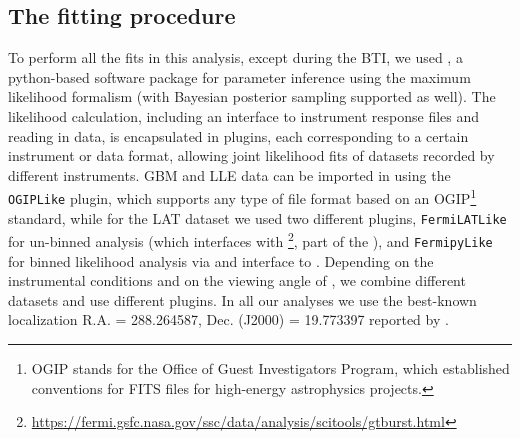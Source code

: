 \documentclass[preprint]{aastex631}
\begin{document}
\subsection{The fitting procedure} 
\label{sec:fitting}
To perform all the fits in this analysis, except during the BTI, we used \ThreeML\citep{3ML}, a python-based software package for parameter inference using the maximum likelihood formalism (with Bayesian posterior sampling supported as well). 
The likelihood calculation, including an interface to instrument response files and reading in data, is encapsulated in plugins, each corresponding to a certain instrument or data format, allowing joint likelihood fits of datasets recorded by different instruments. 
GBM and LLE data can be imported in \ThreeML using the \texttt{OGIPLike} plugin, which supports any type of file format based on an OGIP\footnote{OGIP stands for the Office of Guest Investigators Program, which established conventions for FITS files for high-energy astrophysics projects.} standard, while for the LAT dataset we used two different plugins, \texttt{FermiLATLike} for un-binned analysis (which interfaces with \gtburst\footnote{\url{https://fermi.gsfc.nasa.gov/ssc/data/analysis/scitools/gtburst.html}}, part of the \fermitools), and \texttt{FermipyLike} for binned likelihood analysis via and interface to \fermipy \citep{2017ICRC...35..824W}. 
Depending on the instrumental conditions and on the viewing angle of \grb, we combine different datasets and use different plugins. In all our analyses we use the best-known localization R.A. = 288\degr.264587, Dec. (J2000) = 19\degree.773397 reported by \citet{BOAT_RADIOPOSITION}.
%
%
%
\end{document}
